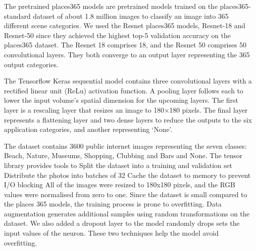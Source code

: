 The pretrained places365 models are 
pretrained models trained on the places365-standard dataset of about
1.8 million images to classify an image into 365
different scene categories. We used the Resnet
places365 models, Resnet-18 and Resnet-50 since they
achieved the highest top-5 validation accuracy on the
places365 dataset. The Resnet 18 comprises 18, and the
Resnet 50 comprises 50 convolutional layers. They both
converge to an output layer representing the 365
output categories.

The Tensorflow Keras sequential model 
contains three convolutional layers with a
rectified linear unit (ReLu) activation function. A
pooling layer follows each to lower the input volume's
spatial dimension for the upcoming layers. The first
layer is a rescaling layer that resizes an image to
180$\times$180 pixels. The final layer represents a
flattening layer and two dense layers to reduce the
outputs to the six application categories, and another
representing `None'.

The dataset contains 3600 public internet images
representing the seven classes: Beach, Nature,
Museums, Shopping, Clubbing and Bars and None. The
tensor library provides tools to Split the dataset
into a training and validation set Distribute the
photos into batches of 32 Cache the dataset to memory
to prevent I/O blocking All of the images were resized
to 180x180 pixels, and the RGB values were normalised
from zero to one.  	Since the dataset is small
compared to the places 365 models, the training
process is prone to overfitting. Data augmentation
generates additional samples using random
transformations on the dataset. We also added
a dropout layer to the model randomly drops sets the
input values of the neuron. These two techniques help
the model avoid overfitting.



